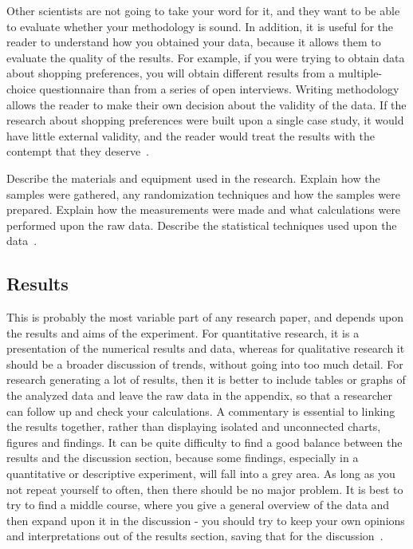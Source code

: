 \documentclass{winslabreport}
\begin{document}
Other scientists are not going to take your word for it, and they want to be able to evaluate whether your methodology is sound. In addition, it is useful for the reader to understand how you obtained your data, because it allows them to evaluate the quality of the results. For example, if you were trying to obtain data about shopping preferences, you will obtain different results from a multiple-choice questionnaire than from a series of open interviews. Writing methodology allows the reader to make their own decision about the validity of the data. If the research about shopping preferences were built upon a single case study, it would have little external validity, and the reader would treat the results with the contempt that they deserve~\cite{Shuttleworth2016}.

Describe the materials and equipment used in the research. Explain how the samples were gathered, any randomization techniques and how the samples were prepared. Explain how the measurements were made and what calculations were performed upon the raw data. Describe the statistical techniques used upon the data~\cite{Shuttleworth2016}.


\subsection{Results}
This is probably the most variable part of any research paper, and depends upon the results and aims of the experiment. For quantitative research, it is a presentation of the numerical results and data, whereas for qualitative research it should be a broader discussion of trends, without going into too much detail. For research generating a lot of results, then it is better to include tables or graphs of the analyzed data and leave the raw data in the appendix, so that a researcher can follow up and check your calculations. A commentary is essential to linking the results together, rather than displaying isolated and unconnected charts, figures and findings. It can be quite difficulty to find a good balance between the results and the discussion section, because some findings, especially in a quantitative or descriptive experiment, will fall into a grey area. As long as you not repeat yourself to often, then there should be no major problem. It is best to try to find a middle course, where you give a general overview of the data and then expand upon it in the discussion - you should try to keep your own opinions and interpretations out of the results section, saving that for the discussion~\cite{Shuttleworth2016}.
\end{document}
